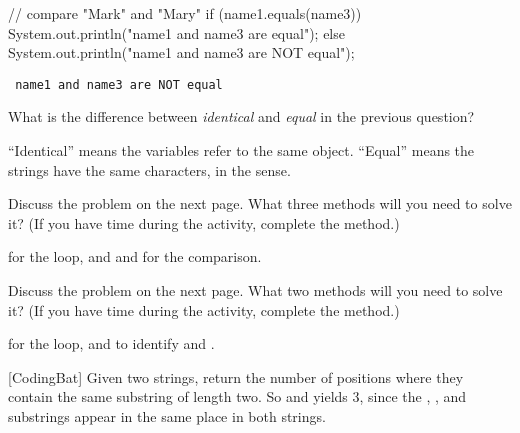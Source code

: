 \begin{javalst}
// compare "Mark" and "Mary"
if (name1.equals(name3)) {
    System.out.println("name1 and name3 are equal");
} else {
    System.out.println("name1 and name3 are NOT equal");
}
\end{javalst}

\vspace{-3ex}
\begin{answer}[1em]
\tt \hspace{1em} name1 and name3 are NOT equal
\end{answer}


\Q What is the difference between \emph{identical} and \emph{equal} in the previous question?

\begin{answer}
``Identical'' means the variables refer to the same  object.
``Equal'' means the strings have the same characters, in the  sense.
\end{answer}


\Q \label{stringMatch}
Discuss the  problem on the next page.
What three  methods will you need to solve it?
(If you have time during the activity, complete the method.)

\begin{answer}
 for the loop, and  and  for the comparison.
\end{answer}


\Q \label{stringYak}
Discuss the  problem on the next page.
What two  methods will you need to solve it?
(If you have time during the activity, complete the method.)

\begin{answer}
 for the loop, and  to identify  and .
\end{answer}


\newpage

[CodingBat] Given two strings, return the number of positions where they contain the same substring of length two. So  and  yields 3, since the , , and  substrings appear in the same place in both strings.

\medskip
\begin{javalst}
public int stringMatch(String a, String b) {
\end{javalst}

